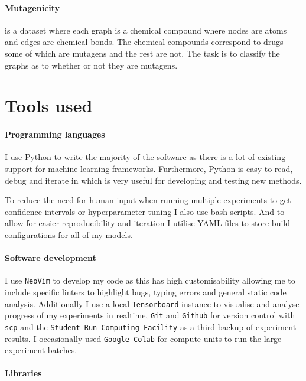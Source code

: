 \paragraph{Mutagenicity}
is a dataset where each graph is a chemical compound where nodes are atoms and edges are chemical bonds.
The chemical compounds correspond to drugs some of which are mutagens and the rest are not.
The task is to classify the graphs as to whether or not they are mutagens.

\section{Tools used}


\paragraph{Programming languages}
I use Python to write the majority of the software as there is a lot of existing support for machine learning frameworks.
Furthermore, Python is easy to read, debug and iterate in which is very useful for developing and testing new methods.

To reduce the need for human input when running multiple experiments to get confidence intervals or hyperparameter tuning I also use bash scripts.
And to allow for easier reproducibility and iteration I utilise YAML files to store build configurations for all of my models.

\paragraph{Software development}

I use \texttt{NeoVim} to develop my code as this has high customisability allowing me to include specific linters to highlight bugs, typing errors and general static code analysis.
Additionally I use a local \texttt{Tensorboard} instance to visualise and analyse progress of my experiments in realtime, \texttt{Git} and \texttt{Github} for version control with \texttt{scp} and the \texttt{Student Run Computing Facility} as a third backup of experiment results.
I occasionally used \texttt{Google Colab} for compute units to run the large experiment batches.

\paragraph{Libraries}
\label{sec:libraries}

